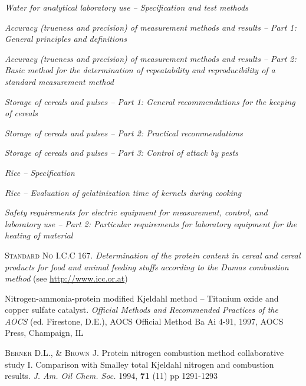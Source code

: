 \begin{thebibliography}{3}

\textit{Water for analytical laboratory use -- Specification and test methods}

\textit{Accuracy (trueness and precision) of measurement methods and results -- Part 1: General principles and definitions}

\textit{Accuracy (trueness and precision) of measurement methods and results -- Part 2: Basic method for the determination of repeatability and reproducibility of a standard measurement method}

\textit{Storage of cereals and pulses -- Part 1: General recommendations for the keeping of cereals}

\textit{Storage of cereals and pulses -- Part 2: Practical recommendations}

\textit{Storage of cereals and pulses -- Part 3: Control of attack by pests}

\textit{Rice -- Specification}

\textit{Rice -- Evaluation of gelatinization time of kernels during cooking}

\textit{Safety requirements for electric equipment for measurement, control, and laboratory use -- Part 2: Particular requirements for laboratory equipment for the heating of material}

\textsc{Standard No I.C.C 167}. \textit{Determination of the protein content in cereal and cereal products for food and animal feeding stuffs according to the Dumas combustion method} (see \url{http://www.icc.or.at})

Nitrogen-ammonia-protein modified Kjeldahl method -- Titanium oxide and copper sulfate catalyst. \textit{Official Methods and Recommended Practices of the AOCS} (ed. Firestone, D.E.), AOCS Official Method Ba Ai 4-91, 1997, AOCS Press, Champaign, IL

\textsc{Berner D.L., \& Brown J.} Protein nitrogen combustion method collaborative study I. Comparison with Smalley total Kjeldahl nitrogen and combustion results. \textit{J. Am. Oil Chem. Soc.} 1994, \textbf{71} (11) pp 1291-1293


\end{thebibliography}
